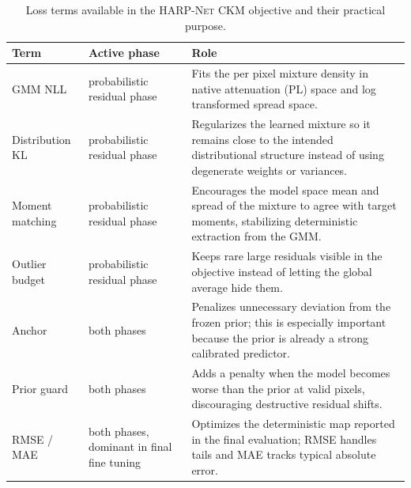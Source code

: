 \documentclass[journal]{IEEEtran}
\begin{document}
\begin{table}[!t]
\centering
\caption{Loss terms available in the \textsc{HARP-Net CKM} objective and their practical
purpose.}
\label{tab:loss-roles}
\scriptsize
\begin{tabularx}{\textwidth}{p{}p{}X}
\toprule
Term & Active phase & Role \\
\midrule
GMM NLL & probabilistic residual phase &
Fits the per pixel mixture density in native attenuation (PL) space and log transformed
spread space. \\
Distribution KL & probabilistic residual phase &
Regularizes the learned mixture so it remains close to the intended
distributional structure instead of using degenerate weights or variances. \\
Moment matching & probabilistic residual phase &
Encourages the model space mean and spread of the mixture to agree with target
moments, stabilizing deterministic extraction from the GMM. \\
Outlier budget & probabilistic residual phase &
Keeps rare large residuals visible in the objective instead of letting the
global average hide them. \\
Anchor & both phases &
Penalizes unnecessary deviation from the frozen prior; this is especially
important because the prior is already a strong calibrated predictor. \\
Prior guard & both phases &
Adds a penalty when the model becomes worse than the prior at valid pixels,
discouraging destructive residual shifts. \\
RMSE / MAE & both phases, dominant in final fine tuning &
Optimizes the deterministic map reported in the final evaluation; RMSE handles
tails and MAE tracks typical absolute error. \\
\bottomrule
\end{tabularx}
\end{table}
\end{document}
